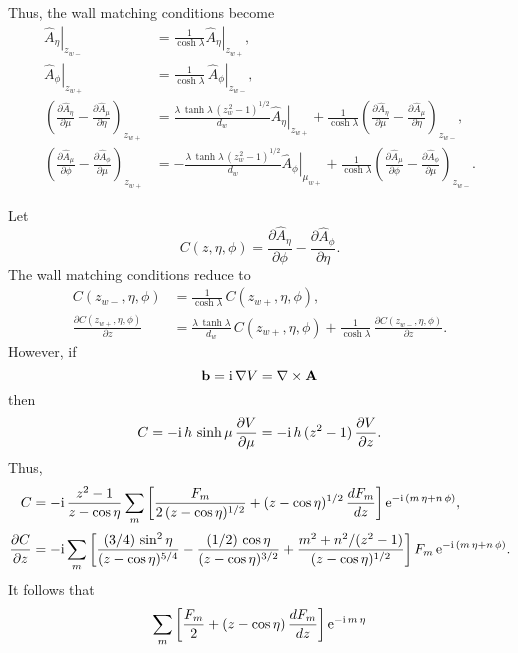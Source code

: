 \documentclass[12pt,prb,aps,notitlepage]{revtex4-1}
\begin{document}
Thus, the wall matching conditions become
\begin{align}
\left.\hat{A}_\eta\right|_{z_{w-}}&= \frac{1}{\cosh\lambda}\left.\hat{A}_\eta\right|_{z_{w+}},\\[0.5ex]
\left.\hat{A}_\phi\right|_{z_{w+}}&= \frac{1}{\cosh\lambda}\,\left.\hat{A}_\phi\right|_{z_{w-}},\\[0.5ex]
\left(\frac{\partial \hat{A}_\eta}{\partial \mu}-\frac{\partial\hat{A}_\mu}{\partial\eta}\right)_{z_{w+}}
&=\frac{\lambda\,\tanh\lambda\,(z_w^{\,2}-1)^{1/2}}{d_w}\left.\hat{A}_\eta\right|_{z_{w+}} + \frac{1}{\cosh\lambda}\left(\frac{\partial \hat{A}_\eta}{\partial \mu}-\frac{\partial\hat{A}_\mu}{\partial\eta}\right)_{z_{w-}},\\[0.5ex]
\left(\frac{\partial \hat{A}_\mu}{\partial \phi}-\frac{\partial\hat{A}_\phi}{\partial\mu}\right)_{z_{w+}}&= -\frac{\lambda\,\tanh\lambda\,(z_w^{\,2}-1)^{1/2}}{d_w}\left.\hat{A}_\phi\right|_{\mu_{w+}}+\frac{1}{\cosh\lambda} \left(\frac{\partial \hat{A}_\mu}{\partial \phi}-\frac{\partial\hat{A}_\phi}{\partial\mu}\right)_{z_{w-}}.
\end{align}

Let
\begin{equation}
C(z,\eta,\phi) = \frac{\partial \hat{A}_\eta}{\partial \phi}- \frac{\partial \hat{A}_\phi}{\partial \eta}.
\end{equation}
The wall matching conditions reduce to 
\begin{align}
C(z_{w-},\eta,\phi) &= \frac{1}{\cosh\lambda}\,C(z_{w+},\eta,\phi),\\[0.5ex]
\frac{\partial C(z_{w+},\eta,\phi) }{\partial z}& = \frac{\lambda\,\tanh\lambda}{d_w}\,C(z_{w+},\eta,\phi) +\frac{1}{\cosh\lambda}\,\frac{\partial C(z_{w-},\eta,\phi) }{\partial z}.
\end{align}
However, if
\begin{equation}
{\bf b} = {\rm i}\,\nabla V =\nabla\times {\bf A}
\end{equation}
then
\begin{equation}
C = -{\rm i}\,h\,\sinh\mu\,\frac{\partial V}{\partial \mu} = -{\rm i}\,h\,(z^2-1)\,\frac{\partial V}{\partial z}.
\end{equation}
Thus,
\begin{align}
C &= -{\rm i}\,\frac{z^2-1}{z-\cos\eta}\sum_m\left[\frac{F_m}{2\,(z-\cos\eta)^{1/2}} + (z-\cos\eta)^{1/2}\,\frac{dF_m}{dz}\right]{\rm e}^{-{\rm i}\,(m\,\eta+n\,\phi)},\\[0.5ex]
\frac{\partial C}{\partial z} &= -{\rm i}\sum_m\left[\frac{(3/4)\,\sin^2\eta}{(z-\cos\eta)^{5/4}}-\frac{(1/2)\,\cos\eta}{(z-\cos\eta)^{3/2}}+ \frac{m^2+n^2/(z^2-1)}{(z-\cos\eta)^{1/2}}\right]
F_m\,{\rm e}^{-{\rm i}\,(m\,\eta+n\,\phi)}.
\end{align}
It follows that
\begin{align}
\sum_m\left[\frac{F_m}{2}+(z-\cos\eta)\,\frac{dF_m}{dz}\right]{\rm e}^{-{\rm i}\,m\,\eta}
\end{align}
\end{document}
